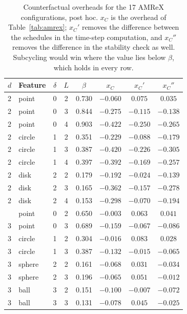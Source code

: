 \documentclass[12pt]{article}
\theoremstyle{remark}
\begin{document}
\begin{table}[ht]
\centering
\small
\caption{Counterfactual overheads for the 17 AMReX configurations, post hoc. $x_C$ is the overhead of Table~\ref{tab:amrex}; $x_C'$ removes the difference between the schedules in the time-step computation, and $x_C''$ removes the difference in the stability check as well. Subcycling would win where the value lies below $\beta$, which holds in every row.}
\label{tab:counterfactual}
\begin{tabular}{llcccccc}
\toprule
$d$ & Feature & $\delta$ & $L$ & $\beta$ & $x_C$ & $x_C'$ & $x_C''$\\
\midrule
2 & point & 0 & 2 & 0.730 & $-0.060$ & $0.075$ & $0.035$\\
2 & point & 0 & 3 & 0.844 & $-0.275$ & $-0.115$ & $-0.138$\\
2 & point & 0 & 4 & 0.903 & $-0.422$ & $-0.250$ & $-0.265$\\
2 & circle & 1 & 2 & 0.351 & $-0.229$ & $-0.088$ & $-0.179$\\
2 & circle & 1 & 3 & 0.387 & $-0.420$ & $-0.226$ & $-0.305$\\
2 & circle & 1 & 4 & 0.397 & $-0.392$ & $-0.169$ & $-0.257$\\
2 & disk & 2 & 2 & 0.179 & $-0.192$ & $-0.024$ & $-0.139$\\
2 & disk & 2 & 3 & 0.165 & $-0.362$ & $-0.157$ & $-0.278$\\
2 & disk & 2 & 4 & 0.153 & $-0.298$ & $-0.070$ & $-0.194$\\
\addlinespace
3 & point & 0 & 2 & 0.650 & $-0.003$ & $0.063$ & $0.041$\\
3 & point & 0 & 3 & 0.689 & $-0.159$ & $-0.067$ & $-0.086$\\
3 & circle & 1 & 2 & 0.304 & $-0.016$ & $0.083$ & $0.028$\\
3 & circle & 1 & 3 & 0.387 & $-0.132$ & $-0.015$ & $-0.065$\\
3 & sphere & 2 & 2 & 0.161 & $-0.068$ & $0.031$ & $-0.034$\\
3 & sphere & 2 & 3 & 0.196 & $-0.065$ & $0.051$ & $-0.012$\\
3 & ball & 3 & 2 & 0.151 & $-0.100$ & $-0.007$ & $-0.072$\\
3 & ball & 3 & 3 & 0.131 & $-0.078$ & $0.045$ & $-0.025$\\
\bottomrule
\end{tabular}
\end{table}

\clearpage


\end{document}
